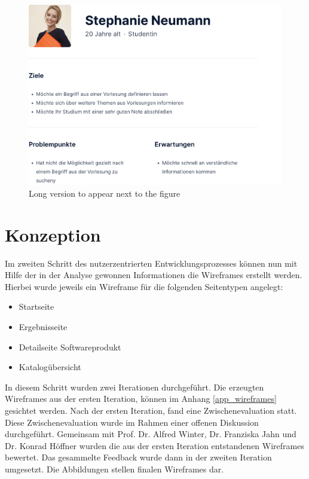 \begin{figure}[H]
	\centering
    	\includegraphics[width=\textwidth]{Images/Persona_3}
   	\caption[Persona 3]{Long version to appear next to the figure}
   	\label{fig:persona3}
\end{figure}

\section{Konzeption}

Im zweiten Schritt des nutzerzentrierten Entwicklungsprozesses können nun mit Hilfe der in der Analyse gewonnen Informationen die Wireframes erstellt werden.
Hierbei wurde jeweils ein Wireframe für die folgenden Seitentypen angelegt:

\begin{itemize}
\item Startseite
\item Ergebnisseite
\item Detailseite Softwareprodukt
\item Katalogübersicht
\end{itemize}

In diesem Schritt wurden zwei Iterationen durchgeführt.
Die erzeugten Wireframes aus der ersten Iteration, können im Anhang \ref{app_wireframes} gesichtet werden.
Nach der ersten Iteration, fand eine Zwischenevaluation statt.
Diese Zwischenevaluation wurde im Rahmen einer offenen Diskussion durchgeführt.
Gemeinsam mit Prof. Dr. Alfred Winter, Dr. Franziska Jahn und Dr. Konrad Höffner wurden die aus der ersten Iteration entstandenen Wireframes bewertet.
Das gesammelte Feedback wurde dann in der zweiten Iteration umgesetzt.
Die Abbildungen  stellen finalen Wireframes dar.

